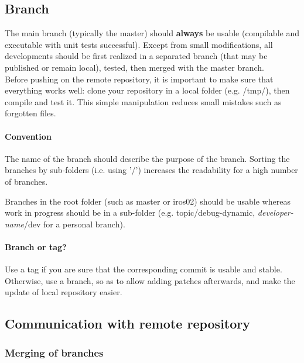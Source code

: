 \subsection{Branch}
The main branch (typically the master) should \textbf{always} be usable (compilable and executable with unit tests successful).
Except from small modifications, all developments should be first realized in a separated branch (that may be published or remain local), tested, then merged with the master branch.\\

Before pushing on the remote repository, it is important to make sure that everything works well: 
clone your repository in a local folder (e.g. /tmp/), then compile and test it.
This simple manipulation reduces small mistakes such as forgotten files.

\paragraph{Convention}
The name of the branch should describe the purpose of the branch.
Sorting the branches by sub-folders (i.e. using '/') increases the readability for a high number of branches.

Branches in the root folder (such as master or iros02) should be usable whereas 
work in progress should be in a sub-folder (e.g. topic/debug-dynamic, \textit{developer-name}/dev for a personal branch).

\paragraph{Branch or tag?}

Use a tag if you are sure that the corresponding commit is usable and stable.
Otherwise, use a branch, so as to allow adding patches afterwards, and make the update of local repository easier.


\subsection{Communication with remote repository}

\subsubsection{Merging of branches}

